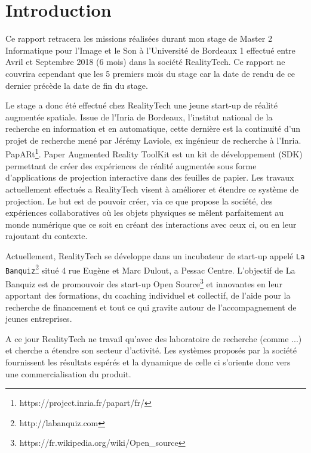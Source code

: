 \chapter{Introduction}

Ce rapport retracera les missions réalisées durant mon stage de Master 2 Informatique pour l'Image et le Son à l'Université de Bordeaux 1 effectué entre Avril et Septembre 2018 (6 mois) dans la société RealityTech. Ce rapport ne couvrira cependant que les 5 premiers mois du stage car la date de rendu de ce dernier précède la date de fin du stage.

Le stage a donc été effectué chez RealityTech une jeune start-up de réalité augmentée spatiale. Issue de l'Inria de Bordeaux, l'institut national de la recherche en information et en automatique, cette dernière est la continuité d'un projet de recherche mené par Jérémy Laviole, ex ingénieur de recherche à l'Inria. PapARt\footnote{https://project.inria.fr/papart/fr/}. Paper Augmented Reality ToolKit est un kit de développement (SDK) permettant de créer des expériences de réalité augmentée sous forme d'applications de projection interactive dans des feuilles de papier. Les travaux actuellement effectués a RealityTech visent à améliorer et étendre ce système de projection. Le but est de pouvoir créer, via ce que propose la société, des expériences collaboratives où les objets physiques se mêlent parfaitement au monde numérique que ce soit en créant des interactions avec ceux ci, ou en leur rajoutant du contexte.

Actuellement, RealityTech se développe dans un incubateur de start-up appelé \texttt{La Banquiz}\footnote{http://labanquiz.com} situé 4 rue Eugène et Marc Dulout, a Pessac Centre. L'objectif de La Banquiz est de promouvoir des start-up Open Source\footnote{https://fr.wikipedia.org/wiki/Open\_source} et innovantes en leur apportant des formations, du coaching individuel et collectif, de l'aide pour la recherche de financement et tout ce qui gravite autour de l'accompagnement de jeunes entreprises.

A ce jour RealityTech ne travail qu'avec des laboratoire de recherche (comme ...) et cherche a étendre son secteur d'activité. Les systèmes proposés par la société fournissent les résultats espérés et la dynamique de celle ci s'oriente donc vers une commercialisation du produit. %

